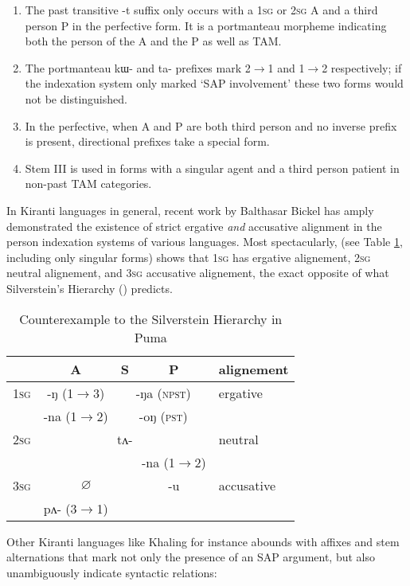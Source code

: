 \documentclass[oldfontcommands,oneside,a4paper,11pt]{article}
\newcommand{\ipa}[1]{{\phon \mbox{#1}}} %
\newcommand{\grise}[1]{\cellcolor{lightgray}\textbf{#1}}
\begin{document}
\begin{enumerate}
\item The past transitive \ipa{-t} suffix only occurs with a \textsc{1sg} or \textsc{2sg} A and a third person P in the perfective form. It is a portmanteau morpheme indicating both the person of the A and the P as well as TAM.
\item The portmanteau \ipa{kɯ-} and \ipa{ta-} prefixes mark 2$\rightarrow$1 and 1$\rightarrow$2 respectively; if the indexation system only marked `SAP involvement' these two forms would not be distinguished.
\item In the perfective, when A and P are both third person and no inverse prefix is present, directional prefixes take a special form.
\item Stem III is used in forms with a singular agent and a third person patient in non-past TAM categories.
\end{enumerate}


In Kiranti languages in general, recent work by Balthasar Bickel has amply demonstrated the existence of strict ergative \textit{and} accusative alignment in the person indexation systems of various languages. Most spectacularly, \citealt{bickel08scope} (see Table \ref{tab:silverstein}, including only singular forms) shows that \textsc{1sg} has ergative alignement, \textsc{2sg} neutral alignement, and \textsc{3sg} accusative alignement, the exact opposite of what  Silverstein's Hierarchy (\citealt{silverstein76}) predicts.


\begin{table}[H]
\caption{Counterexample to the Silverstein Hierarchy in Puma} \label{tab:silverstein} \centering
\begin{tabular}{l|c|c|c|l}
\toprule
& A & S & P & alignement\\
\hline
\textsc{1sg}& \ipa{-ŋ} (1$\rightarrow$3)& \multicolumn{2}{|c|}{\ipa{-ŋa} \grise{}(\textsc{npst})}  &ergative\\
 & \ipa{-na} (1$\rightarrow$2)& \multicolumn{2}{|c|}{\ipa{-oŋ} \grise{}(\textsc{pst})} &\\
\hline
 \textsc{2sg} & \multicolumn{3}{c|}{\ipa{tʌ-}}& neutral\\
 \cline{4-4}
 &\multicolumn{2}{c|}{}&\ipa{-na} (1$\rightarrow$2)&\\
 \hline
  \textsc{3sg} & \multicolumn{2}{c|}{$\varnothing$} & \ipa{-u} &accusative\\
   \cline{2-2}
  &\ipa{pʌ-}  (3$\rightarrow$1) & &\\
  \bottomrule
\end{tabular}
\end{table}
Other Kiranti languages like Khaling for instance abounds with affixes and stem alternations that mark not only the presence of an SAP argument, but also unambiguously indicate syntactic relations:
\end{document}
